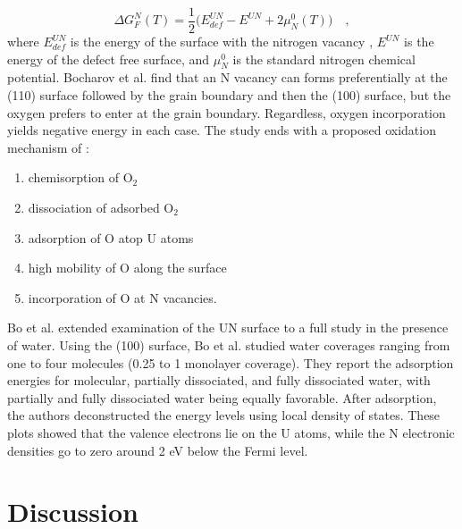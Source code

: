 \documentclass[3p,review,11pt]{elsarticle}
\begin{document}
\begin{equation}
\Delta G^{N}_{F}(T) = \frac{1}{2} \bigg(E^{UN}_{def}-E^{UN}+2\mu _{N}^{0}(T)\bigg) \quad ,
\end{equation} 
where $E^{UN}_{def}$ is the energy of the surface with the nitrogen vacancy , $E^{UN}$ is the energy of the defect free surface, and $\mu _{N}^{0}$ is the standard nitrogen chemical potential. Bocharov et al. find that an N vacancy can forms preferentially at the (110) surface followed by the grain boundary and then the (100) surface, but the oxygen prefers to enter at the grain boundary. Regardless, oxygen incorporation yields negative energy in each case. The study ends with a proposed oxidation mechanism of \cite{Bocharov2013}: 
\begin{enumerate}
	\item chemisorption of O$_{2}$
	\item dissociation of adsorbed O$_{2}$
	\item adsorption of O atop U atoms
	\item high mobility of O along the surface
	\item incorporation of O at N vacancies.
\end{enumerate}
\par 
Bo et al. \cite{Bo2016} extended examination of the UN surface to a full study in the presence of water. Using the (100) surface, Bo et al. studied water coverages ranging from one to four molecules (0.25 to 1 monolayer coverage). They report the adsorption energies for molecular, partially dissociated, and fully dissociated water, with partially and fully dissociated water being equally favorable. After adsorption, the authors deconstructed the energy levels using local density of states. These plots showed that the valence electrons lie on the U atoms, while the N electronic densities go to zero around 2 eV below the Fermi level.

\section{Discussion}
\end{document}
